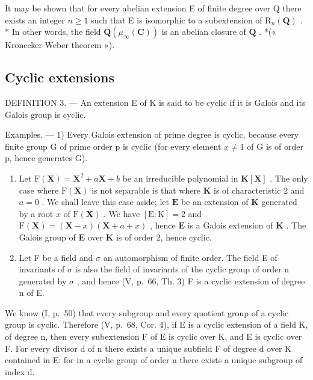 It may be shown that for every abelian extension E of finite degree over Q there exists an integer \(n \geqslant 1\) such that E is isomorphic to a subextension of \(\mathrm{R}_{n}(\mathbf{Q})\) . * In other words, the field \(\mathbf{Q}(\mu_{\infty}(\mathbf{C}))\) is an abelian closure of \(\mathbf{Q}\) . *(« Kronecker-Weber theorem »).

\subsection{Cyclic extensions}

DEFINITION 3. --- An extension E of K is said to be cyclic if it is Galois and its Galois group is cyclic.

Examples. --- 1) Every Galois extension of prime degree is cyclic, because every finite group G of prime order p is cyclic (for every element \(x \neq 1\) of G is of order p, hence generates G).

\begin{enumerate}
\def\labelenumi{\arabic{enumi})}
\setcounter{enumi}{1}
\item
  Let \(\mathrm{F}(\mathbf{X}) = \mathbf{X}^2 + a\mathbf{X} + b\) be an irreducible polynomial in \(\mathbf{K}[\mathbf{X}]\) . The only case where \(\mathrm{F}(\mathbf{X})\) is not separable is that where \(\mathbf{K}\) is of characteristic 2 and \(a = 0\) . We shall leave this case aside; let \(\mathbf{E}\) be an extension of \(\mathbf{K}\) generated by a root \(x\) of \(\mathrm{F}(\mathbf{X})\) . We have \([\mathrm{E}:\mathrm{K}] = 2\) and \(\mathrm{F}(\mathbf{X}) = (\mathbf{X} - x)(\mathbf{X} + a + x)\) , hence \(\mathbf{E}\) is a Galois extension of \(\mathbf{K}\) . The Galois group of \(\mathbf{E}\) over \(\mathbf{K}\) is of order 2, hence cyclic.
\item
  Let F be a field and \(\sigma\) an automorphism of finite order. The field E of invariants of \(\sigma\) is also the field of invariants of the cyclic group of order n generated by \(\sigma\) , and hence (V, p.~66, Th. 3) F is a cyclic extension of degree n of E.
\end{enumerate}

We know (I, p.~50) that every subgroup and every quotient group of a cyclic group is cyclic. Therefore (V, p.~68, Cor. 4), if E is a cyclic extension of a field K, of degree n, then every subextension F of E is cyclic over K, and E is cyclic over F. For every divisor d of n there exists a unique subfield F of degree d over K contained in E: for in a cyclic group of order n there exists a unique subgroup of index d.

